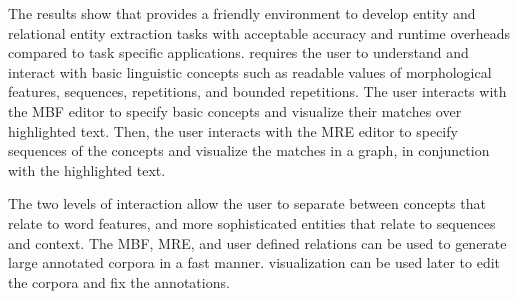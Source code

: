 The results show that \framework 
provides a friendly environment to develop entity and relational
entity extraction tasks with acceptable 
accuracy and runtime overheads compared to task specific applications. 
%
\framework requires the user to understand and interact with 
basic linguistic concepts such as readable values of morphological 
features, sequences, repetitions, and bounded repetitions. 
The user interacts with the MBF editor to specify basic concepts
and visualize their matches over highlighted text. 
%
Then, the user interacts with the MRE editor to specify 
sequences of the concepts and visualize the matches
in a graph, in conjunction with the highlighted text.

The two levels of interaction allow the user to separate between concepts 
that relate to word features, and more sophisticated entities 
that relate to sequences and context. 
%
The MBF, MRE, and user defined relations 
can be used to generate large annotated corpora in a fast manner. 
\framework visualization can be used later to edit the corpora 
and fix the annotations.
%

